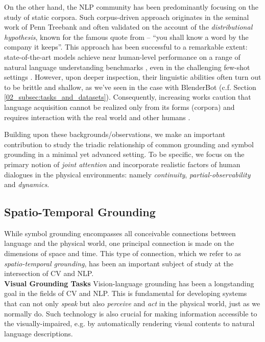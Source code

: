 On the other hand, the NLP community has been predominantly focusing on the study of static corpora. Such corpus-driven approach originates in the seminal work of Penn Treebank \citep{marcus-etal-1993-building} and often validated on the account of the \textit{distributional hypothesis}, known for the famous quote from \citet{firth1957synopsis} -- ``you shall know a word by the company it keeps''. This approach has been successful to a remarkable extent: state-of-the-art models achieve near human-level performance on a range of natural language understanding benchmarks \citep{wang-etal-2018-glue,devlin-etal-2019-bert}, even in the challenging few-shot settings \citep{NEURIPS2020_1457c0d6}. However, upon deeper inspection, their linguistic abilities often turn out to be brittle and shallow, as we've seen in the case with BlenderBot (c.f. Section \ref{02_subsec:tasks_and_datasets}). Consequently, increasing works caution that language acquisition cannot be realized only from its forms (corpora) and requires interaction with the real world and other humans \citep{bisk-etal-2020-experience,bender-koller-2020-climbing,benotti-blackburn-2021-grounding}. 

Building upon these backgrounds/observations, we make an important contribution to study the triadic relationship of common grounding and symbol grounding in a minimal yet advanced setting. To be specific, we focus on the primary notion of \textit{joint attention} and incorporate realistic factors of human dialogues in the physical environments: namely \textit{continuity}, \textit{partial-observability} and \textit{dynamics}.


\subsection{Spatio-Temporal Grounding}
\label{02_subsec:spatio_temporal_grounding}

While symbol grounding encompasses all conceivable connections between language and the physical world, one principal connection is made on the dimensions of space and time. This type of connection, which we refer to as \textit{spatio-temporal grounding}, has been an important subject of study at the intersection of CV and NLP.
\\

\noindent
\textbf{Visual Grounding Tasks}\quad
Vision-language grounding has been a longstanding goal in the fields of CV and NLP. This is fundamental for developing systems that can not only \textit{speak} but also \textit{perceive} and \textit{act} in the physical world, just as we normally do. Such technology is also crucial for making information accessible to the visually-impaired, e.g. by automatically rendering visual contents to natural language descriptions.

